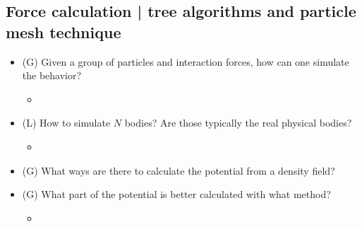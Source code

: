 \subsection*{Force calculation | tree algorithms and particle mesh technique}

\begin{itemize}
    \item (G) Given a group of particles and interaction forces, how can one simulate the behavior?
    \begin{itemize}
        \item {}
    \end{itemize}
    \item (L) How to simulate $N$ bodies? Are those typically the real physical bodies?
    \begin{itemize}
        \item {}
    \end{itemize}
    \item (G) What ways are there to calculate the potential from a density field?
    \item (G) What part of the potential is better calculated with what method?
    \begin{itemize}
        \item {}
    \end{itemize}
\end{itemize}

